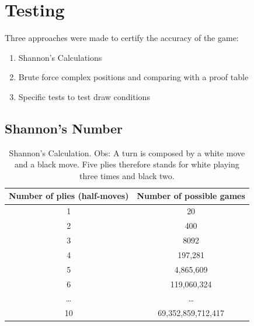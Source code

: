 \documentclass[10pt]{article}
\begin{document}
\section{Testing}

Three approaches were made to certify the accuracy of the game:

\begin{enumerate}[label=\arabic*)]
\item Shannon's Calculations
\item Brute force complex positions and comparing with a proof table
\item Specific tests to test draw conditions
\end{enumerate}


\subsection{Shannon's Number}


\begin{table}[H]
\center
\begin{tabular}{|c|c|}
\hline
\textbf{Number of plies (half-moves)}  & \textbf{Number of possible games}  \\
\hline
  1   & 20 \\
\hline
   2  &  400 \\
\hline
  3   & 8092 \\
\hline
4  & 197,281 \\
\hline
5   & 4,865,609 \\
\hline
6   & 119,060,324 \\
\hline
\ldots & \ldots \\
\hline
10 & 69,352,859,712,417 \\
\hline
\end{tabular}
\caption{Shannon's Calculation. Obs: A turn is composed by a white move and a black move. Five plies
therefore stands for white playing three times and black two.}
\end{table}
\end{document}
